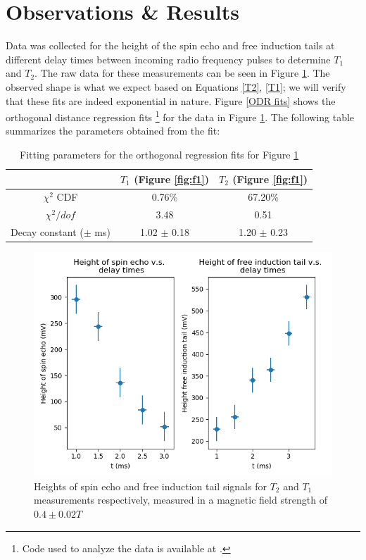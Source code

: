\documentclass[a4paper, 12pt]{article}  %
\begin{document}
\section{Observations \& Results}\label{results}

Data was collected for the height of the spin echo and free induction tails at different delay times between incoming radio frequency pulses to determine $T_1$ and $T_2$. The raw data for these measurements can be seen in Figure \ref{fig:raw_data}. The observed shape is what we expect based on Equations \ref{T2}, \ref{T1}; we will verify that these fits are indeed exponential in nature. Figure \ref{ODR fits} shows the orthogonal distance regression fits \footnote{Code used to analyze the data is available at \cite{ODR}.} for the data in Figure \ref{fig:raw_data}. The following table summarizes the parameters obtained from the fit:

\begin{table}[htb]
    \centering
    \begin{tabular}{|c|c|c|}
    \hline
         & $T_1$ (Figure \ref{fig:f1}) & $T_2$ (Figure \ref{fig:f1})\\
        \hline
        $\chi^2$ CDF & 0.76\% & 67.20\% \\
        
        $\chi^2 / dof$ & 3.48 & 0.51  \\
        
        Decay constant ($\pm$ ms) & 1.02 $\pm$ 0.18 & 1.20 $\pm$ 0.23          \\
        \hline
    \end{tabular}
    \caption{Fitting parameters for the orthogonal regression fits for Figure \ref{fig:raw_data}}
    \label{tab:fit_parameters}
\end{table}


\begin{figure}[htb]
    \centering
    \includegraphics[scale=0.65]{raw_data.png}
    \caption{Heights of spin echo and free induction tail signals for $T_2$ and $T_1$ measurements respectively, measured in a magnetic field strength of $0.4 \pm 0.02 T$}
    \label{fig:raw_data}
\end{figure}
\end{document}
